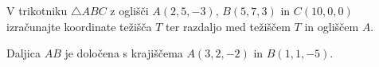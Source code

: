 \documentclass[addpoints]{exam}
\begin{document}
\begin{questions}
    

    \question[4]
    V trikotniku $\triangle ABC$ z oglišči $A(2,5,-3)$, $B(5,7,3)$ in $C(10,0,0)$ izračunajte koordinate težišča $T$ ter razdaljo med težiščem $T$ in ogliščem $A$.






    














    \question
    Daljica $AB$ je določena s krajiščema $A(3,2,-2)$ in $B(1,1,-5)$.
    
\end{questions}
\end{document}
